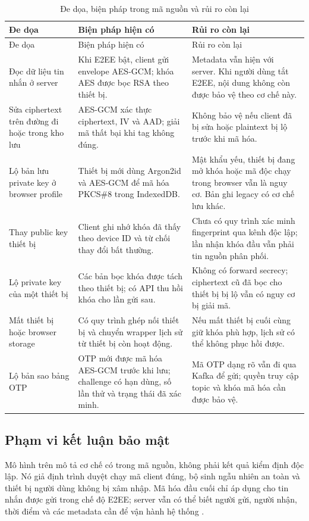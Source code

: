 \begin{longtable}{p{}p{}p{}}
\caption{Đe dọa, biện pháp trong mã nguồn và rủi ro còn lại}\label{tab:de-doa}\\
\toprule
Đe dọa & Biện pháp hiện có & Rủi ro còn lại \\
\midrule
\endfirsthead
\toprule Đe dọa & Biện pháp hiện có & Rủi ro còn lại \\ \midrule
\endhead
Đọc dữ liệu tin nhắn ở server & Khi E2EE bật, client gửi envelope AES-GCM; khóa AES được bọc RSA theo thiết bị. & Metadata vẫn hiện với server. Khi người dùng tắt E2EE, nội dung không còn được bảo vệ theo cơ chế này. \\
Sửa ciphertext trên đường đi hoặc trong kho lưu & AES-GCM xác thực ciphertext, IV và AAD; giải mã thất bại khi tag không đúng. & Không bảo vệ nếu client đã bị sửa hoặc plaintext bị lộ trước khi mã hóa. \\
Lộ bản lưu private key ở browser profile & Thiết bị mới dùng Argon2id và AES-GCM để mã hóa PKCS\#8 trong IndexedDB. & Mật khẩu yếu, thiết bị đang mở khóa hoặc mã độc chạy trong browser vẫn là nguy cơ. Bản ghi legacy có cơ chế lưu khác. \\
Thay public key thiết bị & Client ghi nhớ khóa đã thấy theo device ID và từ chối thay đổi bất thường. & Chưa có quy trình xác minh fingerprint qua kênh độc lập; lần nhận khóa đầu vẫn phải tin nguồn phân phối. \\
Lộ private key của một thiết bị & Các bản bọc khóa được tách theo thiết bị; có API thu hồi khóa cho lần gửi sau. & Không có forward secrecy; ciphertext cũ đã bọc cho thiết bị bị lộ vẫn có nguy cơ bị giải mã. \\
Mất thiết bị hoặc browser storage & Có quy trình ghép nối thiết bị và chuyển wrapper lịch sử từ thiết bị còn hoạt động. & Nếu mất thiết bị cuối cùng giữ khóa phù hợp, lịch sử có thể không phục hồi được. \\
Lộ bản sao bảng OTP & OTP mới được mã hóa AES-GCM trước khi lưu; challenge có hạn dùng, số lần thử và trạng thái đã xác minh. & Mã OTP dạng rõ vẫn đi qua Kafka để gửi; quyền truy cập topic và khóa mã hóa cần được bảo vệ. \\
\bottomrule
\end{longtable}

\subsection{Phạm vi kết luận bảo mật}
Mô hình trên mô tả cơ chế có trong mã nguồn, không phải kết quả kiểm định độc lập. Nó giả định trình duyệt chạy mã client đúng, bộ sinh ngẫu nhiên an toàn và thiết bị người dùng không bị xâm nhập. Mã hóa đầu cuối chỉ áp dụng cho tin nhắn được gửi trong chế độ E2EE; server vẫn có thể biết người gửi, người nhận, thời điểm và các metadata cần để vận hành hệ thống \cite{e2ee,relationship}.

